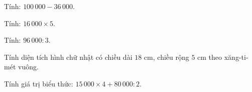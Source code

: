 \begin{ex} %
Tính: $100\,000 - 36\,000$.
\end{ex}

\begin{ex} %
Tính: $16\,000 \times 5$.
\end{ex}

\begin{ex} %
Tính: $96\,000 : 3$.
\end{ex}

\begin{ex} %
Tính diện tích hình chữ nhật có chiều dài $18\text{ cm}$, chiều rộng $5\text{ cm}$ theo xăng-ti-mét vuông.
\end{ex}

\begin{ex} %
Tính giá trị biểu thức: $15\,000 \times 4 + 80\,000 : 2$.
\end{ex}
